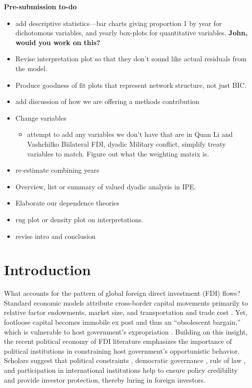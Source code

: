 \documentclass{article}
\begin{document}
{\bf Pre-submission to-do}
\begin{itemize}
\item add descriptive statistics---bar charts giving proportion 1 by year for dichotomous variables, and yearly box-plots for quantitative variables. {\bf John, would you work on this?}
\item Revise interpretation plot so that they don't sound like actual residuals from the model.
\item Produce goodness of fit plots that represent network structure, not just BIC.
\item add discussion of how we are offering a methods contribution
\item Change variables
\begin{itemize}
\item attempt to add any variables we don't have that are in Quan Li and Vashchilko Biilateral FDI, dyadic Military conflict, simplify treaty variables to match. Figure out what the weighting matrix is.
\end{itemize}
\item re-estimate combining years
\item Overview, list or summary of valued dyadic analysis in IPE.
\item Elaborate our dependence theories
\item rug plot or density plot on interpretations.
\item  revise intro and conclusion
\end{itemize}

\clearpage
\doublespacing
\section{Introduction}


What accounts for the pattern of global foreign direct investment (FDI) flows? Standard economic models attribute cross-border capital movements primarily to relative factor endowments, market size, and transportation and trade cost \citep[see,~e.g.,][]{Helpman:1984,Carr_et_al:2001}. Yet, footloose capital becomes immobile ex post and thus an ``obsolescent bargain,'' which is vulnerable to host government's expropriation \citep{Vernon:1971,Vernon:1980}. Building on this insight, the recent political economy of FDI literature emphasizes the importance of political institutions in constraining host government's opportunistic behavior. Scholars suggest that political constraints \citep{Henisz:2000}, democratic governance \citep{Jensen:2003,Jensen:2006}, rule of law \citep{Li_Resnick:2003,Staats_Biglaiser:2012}, and participation in international institutions \citep{Buthe_Milner:2008,Allee_Peinhardt:2011} help to ensure policy credibility and provide investor protection, thereby luring in foreign investors.
\end{document}
